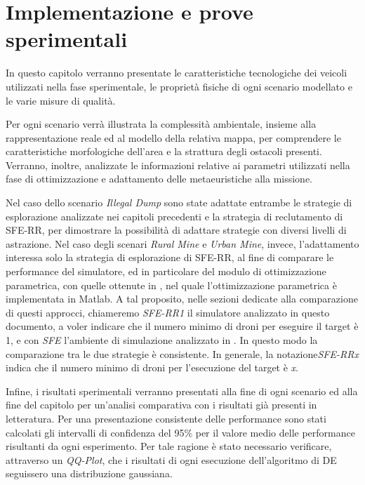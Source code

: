 \chapter{Implementazione e prove sperimentali}

In questo capitolo verranno presentate le caratteristiche tecnologiche dei veicoli utilizzati nella fase sperimentale, le proprietà fisiche di ogni scenario modellato e le varie misure di qualità.

Per ogni scenario verrà illustrata la complessità ambientale, insieme alla rappresentazione reale ed al modello della relativa mappa, per comprendere le caratteristiche morfologiche dell'area e la strattura degli ostacoli presenti.
Verranno, inoltre, analizzate le informazioni relative ai parametri utilizzati nella fase di ottimizzazione e adattamento delle metaeuristiche alla missione.

Nel caso dello scenario \textit{Illegal Dump} sono state adattate entrambe le strategie di esplorazione analizzate nei capitoli precedenti e la strategia di reclutamento di SFE-RR, per dimostrare la possibilità di adattare strategie con diversi livelli di astrazione.
Nel caso degli scenari \textit{Rural Mine} e \textit{Urban Mine}, invece, l'adattamento interessa solo la strategia di esplorazione di SFE-RR, al fine di comparare le performance del simulatore, ed in particolare del modulo di ottimizzazione parametrica, con quelle ottenute in \cite{cimino2019adaptive}, nel quale l'ottimizzazione parametrica è implementata in Matlab.
A tal proposito, nelle sezioni dedicate alla comparazione di questi approcci, chiameremo \textit{SFE-RR1} il simulatore analizzato in questo documento, a voler indicare che il numero minimo di droni per eseguire il target è 1, e con \textit{SFE} l'ambiente di simulazione analizzato in \cite{cimino2019adaptive}.
In questo modo la comparazione tra le due strategie è consistente.
In generale, la notazione\textit{SFE-RRx} indica che il numero minimo di droni per l'esecuzione del target è \textit{x}.

Infine, i risultati sperimentali verranno presentati alla fine di ogni scenario ed alla fine del capitolo per un'analisi comparativa con i risultati già presenti in letteratura.
Per una presentazione consistente delle performance sono stati calcolati gli intervalli di confidenza del 95\% per il valore medio delle performance risultanti da ogni esperimento.
Per tale ragione è stato necessario verificare, attraverso un \textit{QQ-Plot}, che i risultati di ogni esecuzione dell'algoritmo di DE seguissero una distribuzione gaussiana.

